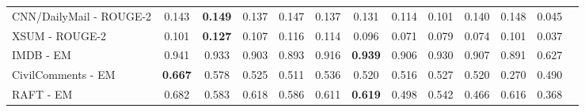 \documentclass{article}
\begin{document}
\begin{table}[!tbp]
{\begin{tabular}{lcccccccccccc}
CNN/DailyMail - ROUGE-2 & 0.143 & \bf 0.149 & 0.137 & 0.147 & 0.137 & 0.131 & 0.114 & 0.101 & 0.140 & 0.148 & 0.045 \\
XSUM - ROUGE-2 & 0.101 & \bf 0.127 & 0.107 & 0.116 & 0.114 & 0.096 & 0.071 & 0.079 & 0.074 & 0.101 & 0.037 \\
IMDB - EM & 0.941 & 0.933 & 0.903 & 0.893 & 0.916 & \bf 0.939 & 0.906 & 0.930 & 0.907 & 0.891 & 0.627 \\
CivilComments - EM & \bf  0.667 & 0.578 & 0.525 & 0.511 & 0.536 & 0.520 & 0.516 & 0.527 & 0.520 & 0.270 & 0.490 \\
RAFT - EM & 0.682 & 0.583 & 0.618 & 0.586 & 0.611 & \bf 0.619 & 0.498 & 0.542 & 0.466 & 0.616 & 0.368 \\
\bottomrule
\end{tabular}
}
\end{table}
\end{document}
